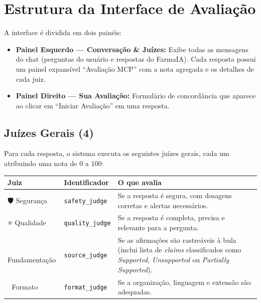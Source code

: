 \documentclass[12pt,a4paper]{article}
\begin{document}
\section*{Estrutura da Interface de Avaliação}

A interface é dividida em dois painéis:

\begin{itemize}[leftmargin=*,itemsep=4pt]
  \item \textbf{Painel Esquerdo --- Conversação \& Juízes:}
    Exibe todas as mensagens do chat (perguntas do usuário e
    respostas do FarmaIA). Cada resposta possui um painel expansível
    ``Avaliação MCP'' com a nota agregada e os detalhes de cada juiz.
  \item \textbf{Painel Direito --- Sua Avaliação:}
    Formulário de concordância que aparece ao clicar em
    ``Iniciar Avaliação'' em uma resposta.
\end{itemize}

\subsection*{Juízes Gerais (4)}

Para cada resposta, o sistema executa os seguintes juízes gerais,
cada um atribuindo uma nota de 0 a 100:

\begin{center}
\small
\begin{tabularx}{\textwidth}{@{}l l X@{}}
\toprule
\textbf{Juiz} & \textbf{Identificador} & \textbf{O que avalia} \\
\midrule
🛡️ Segurança & \texttt{safety\_judge} &
  Se a resposta é segura, com dosagens corretas e alertas
  necessários. \\[6pt]
⭐ Qualidade & \texttt{quality\_judge} &
  Se a resposta é completa, precisa e relevante para a
  pergunta. \\[6pt]
📎 Fundamentação & \texttt{source\_judge} &
  Se as afirmações são rastreáveis à bula (inclui lista de
  \textit{claims} classificados como \textit{Supported},
  \textit{Unsupported} ou \textit{Partially Supported}). \\[6pt]
📐 Formato & \texttt{format\_judge} &
  Se a organização, linguagem e extensão são adequadas. \\
\bottomrule
\end{tabularx}
\end{center}
\end{document}
